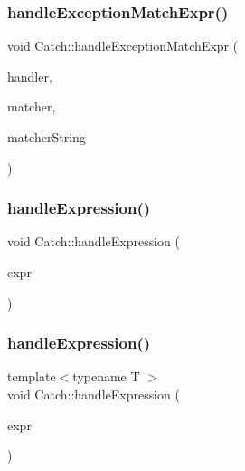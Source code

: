 \mbox{\label{namespace_catch_a3a96a82307107087642e22fc4be5844d}} 
\subsubsection{handleExceptionMatchExpr()\hspace{0.1cm}{\footnotesize\ttfamily [2/2]}}
{\footnotesize\ttfamily void Catch\+::handle\+Exception\+Match\+Expr (\begin{DoxyParamCaption}\item[{\textbf{ Assertion\+Handler} \&}]{handler,  }\item[{\textbf{ String\+Matcher} const \&}]{matcher,  }\item[{\textbf{ String\+Ref} const \&}]{matcher\+String }\end{DoxyParamCaption})}

\mbox{\label{namespace_catch_a65af25091f2ab61056e166765963e525}} 
\subsubsection{handleExpression()\hspace{0.1cm}{\footnotesize\ttfamily [1/2]}}
{\footnotesize\ttfamily void Catch\+::handle\+Expression (\begin{DoxyParamCaption}\item[{\textbf{ I\+Transient\+Expression} const \&}]{expr }\end{DoxyParamCaption})}

\mbox{\label{namespace_catch_af2c93db76668a981e75ae835699efce7}} 
\subsubsection{handleExpression()\hspace{0.1cm}{\footnotesize\ttfamily [2/2]}}
{\footnotesize\ttfamily template$<$typename T $>$ \\
void Catch\+::handle\+Expression (\begin{DoxyParamCaption}\item[{\textbf{ Expr\+Lhs}$<$ T $>$ const \&}]{expr }\end{DoxyParamCaption})}

